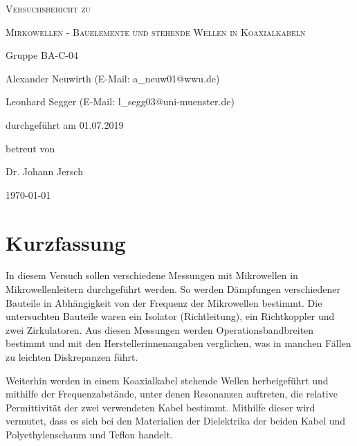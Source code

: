\documentclass[
	a4paper,
	12pt,
	pagesize,
	ngerman
]{scrartcl}
\begin{document}
	\begin{titlepage}
		\centering
		{\scshape\LARGE Versuchsbericht zu \par}
		\vspace{1cm}
		{\scshape\huge Mirkowellen - Bauelemente und stehende Wellen in Koaxialkabeln \par}
		\vspace{2.5cm}
		{\LARGE Gruppe BA-C-04 \par}
		\vspace{0.5cm}

		{\large Alexander Neuwirth (E-Mail: a\_neuw01@wwu.de) \par}
		{\large Leonhard Segger (E-Mail: l\_segg03@uni-muenster.de) \par}
		\vfill

		durchgeführt am 01.07.2019\par
		betreut von\par
		{\large Dr. Johann Jersch}

		\vfill

		{\large \today\par}
	\end{titlepage}
	\tableofcontents
	\newpage


	\section{Kurzfassung}
	In diesem Versuch sollen verschiedene Messungen mit Mikrowellen in Mikrowellenleitern durchgeführt werden.
	So werden Dämpfungen verschiedener Bauteile in Abhängigkeit von der Frequenz der Mikrowellen bestimmt.
	Die untersuchten Bauteile waren ein Isolator (Richtleitung), ein Richtkoppler und zwei Zirkulatoren.
	Aus diesen Messungen werden Operationsbandbreiten bestimmt und mit den Herstellerinnenangaben verglichen, was in manchen Fällen zu leichten Diskrepanzen führt.

	Weiterhin werden in einem Koaxialkabel stehende Wellen herbeigeführt und  mithilfe der Frequenzabstände, unter denen Resonanzen auftreten, die relative Permittivität der zwei verwendeten Kabel bestimmt.
	Mithilfe dieser wird vermutet, dass es sich bei den Materialien der Dielektrika der beiden Kabel und Polyethylenschaum und Teflon handelt.
\end{document}
